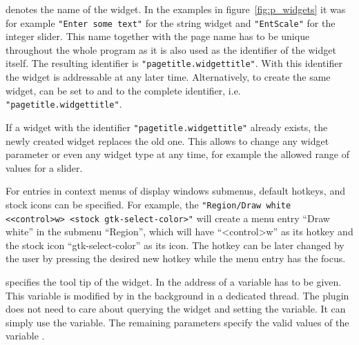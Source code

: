  denotes the name of the widget. In the examples in
figure~\ref{fig:p_widgets} it was for example
\verb|"Enter some text"| for the string widget and \verb|"EntScale"|
for the integer slider. This name together with the page name has to
be unique throughout the whole program as it is also used as the
identifier of the widget itself. The resulting identifier is
\verb|"pagetitle.widgettitle"|. With this identifier the widget is
addressable at any later time. Alternatively, to create the same
widget,  can be set to  and  to the
complete identifier, i.e. \verb|"pagetitle.widgettitle"|.

If a widget with the identifier \verb|"pagetitle.widgettitle"|
already exists, the newly created widget replaces the old one. This
allows to change any widget parameter or even any widget type at any
time, for example the allowed range of values for a slider.

For entries in context menus of display windows submenus, default
hotkeys, and stock icons can be specified. For example, the
\verb|"Region/Draw white <<control>w> <stock gtk-select-color>"|
will create a menu entry ``Draw white'' in the submenu ``Region'',
which will have ``\textless{}control\textgreater{}w'' as its
hotkey and the stock icon ``gtk-select-color'' as its icon. The
hotkey can be later changed by the user by pressing the desired new
hotkey while the menu entry has the focus.

 specifies the tool tip of the widget. In  the
address of a variable has to be given. This variable is modified by
\icewing{} in the background in a dedicated thread. The plugin does
not need to care about querying the widget and setting the
variable. It can simply use the variable. The remaining parameters
specify the valid values of the variable .

